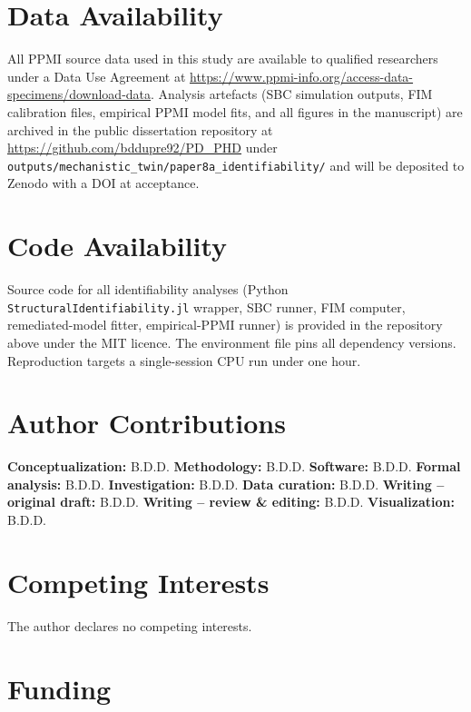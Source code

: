 
\section*{Data Availability}

All PPMI source data used in this study are available to qualified researchers under a Data Use Agreement at \url{https://www.ppmi-info.org/access-data-specimens/download-data}. Analysis artefacts (SBC simulation outputs, FIM calibration files, empirical PPMI model fits, and all figures in the manuscript) are archived in the public dissertation repository at \url{https://github.com/bddupre92/PD_PHD} under \texttt{outputs/mechanistic\_twin/paper8a\_identifiability/} and will be deposited to Zenodo with a DOI at acceptance.

\section*{Code Availability}

Source code for all identifiability analyses (Python \texttt{StructuralIdentifiability.jl} wrapper, SBC runner, FIM computer, remediated-model fitter, empirical-PPMI runner) is provided in the repository above under the MIT licence. The environment file pins all dependency versions. Reproduction targets a single-session CPU run under one hour.

\section*{Author Contributions}

\textbf{Conceptualization:} B.D.D. \textbf{Methodology:} B.D.D. \textbf{Software:} B.D.D. \textbf{Formal analysis:} B.D.D. \textbf{Investigation:} B.D.D. \textbf{Data curation:} B.D.D. \textbf{Writing -- original draft:} B.D.D. \textbf{Writing -- review \& editing:} B.D.D. \textbf{Visualization:} B.D.D.

\section*{Competing Interests}

The author declares no competing interests.

\section*{Funding}

